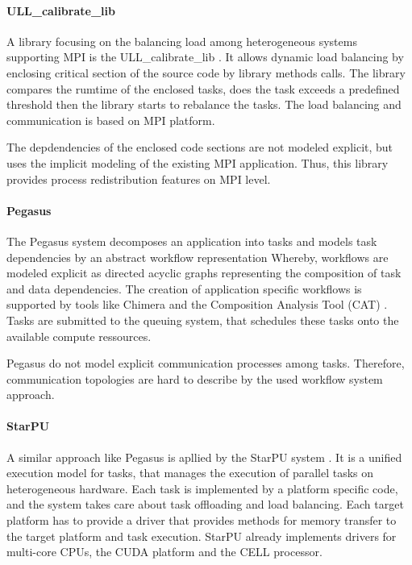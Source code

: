 \paragraph*{ULL\_calibrate\_lib}
A library focusing on the balancing load among heterogeneous systems
supporting MPI is the ULL\_calibrate\_lib
\cite{ref:ull_calibrate_lib}. It allows dynamic load balancing by
enclosing critical section of the source code by library methods
calls. The library compares the rumtime of the enclosed tasks, does
the task exceeds a predefined threshold then the library starts to
rebalance the tasks. The load balancing and communication is based on
MPI platform.

The depdendencies of the enclosed code sections are not modeled
explicit, but uses the implicit modeling of the existing MPI
application. Thus, this library provides process redistribution
features on MPI level.

\paragraph*{Pegasus}
The Pegasus system \cite{ref:pegasus} decomposes an application into
tasks and models task dependencies by an abstract workflow
representation Whereby, workflows are modeled explicit as directed
acyclic graphs representing the composition of task and data
dependencies. The creation of application specific workflows is
supported by tools like Chimera \cite{ref:chimera} and the Composition
Analysis Tool (CAT) \cite{ref:cat}.  Tasks are submitted to the
queuing system, that schedules these tasks onto the available compute
ressources.

Pegasus do not model explicit communication processes among tasks.
Therefore, communication topologies are hard to describe by the used
workflow system approach.


\paragraph*{StarPU} 
A similar approach like Pegasus is apllied by the StarPU system
\cite{ref:starpu}.  It is a unified execution model for tasks, that
manages the execution of parallel tasks on heterogeneous hardware.
Each task is implemented by a platform specific code, and the system
takes care about task offloading and load balancing. Each target
platform has to provide a driver that provides methods for memory
transfer to the target platform and task execution. StarPU already
implements drivers for multi-core CPUs, the CUDA platform and the CELL
processor.



